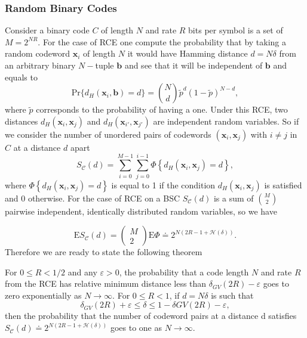 \subsubsection{Random Binary Codes}
Consider a binary code $C$ of length $N$ and rate $R$ bits per symbol is a set of $M=2^{NR}$. For the case of RCE one compute the probability that by taking a random codeword $\mathbf{x}_i$ of length $N$ it would have Hamming distance $d=N\delta$ from an arbitrary binary $N-$tuple $\mathbf{b}$ and see that it will be independent of $\mathbf{b}$ and equals to
\begin{equation}
\text{Pr}\{d_H(\mathbf{x}_i,\mathbf{b})=d\}={N\choose d} \tilde{p}^d (1-\tilde{p})^{N-d},
\end{equation}
where $\tilde{p}$ corresponds to the probability of having a one. Under this RCE, two distances $d_H(\mathbf{x}_i,\mathbf{x}_j)$ and $d_H(\mathbf{x}_{i'},\mathbf{x}_{j'})$ are independent random variables. So if we consider the number of unordered pairs of codewords $(\mathbf{x}_i,\mathbf{x}_j)$ with $i\neq j$ in $C$ at a distance $d$ apart
\begin{equation}
S_{\mathcal{C}}(d)=\sum_{i=0}^{M-1} \sum_{j=0}^{i-1} \Phi\left\{d_{H}\left(\boldsymbol{x}_{i}, \boldsymbol{x}_{j}\right)=d\right\},
\end{equation}
where $\Phi\left\{d_{H}\left(\boldsymbol{x}_{i}, \boldsymbol{x}_{j}\right)=d\right\}$ is equal to 1 if the condition $d_H(\mathbf{x}_i,\mathbf{x}_j)$ is satisfied and $0$ otherwise. For the case of RCE on a BSC $S_{\mathcal{C}}(d)$ is a sum of ${M\choose 2}$ pairwise independent, identically distributed random variables, so we have

\begin{equation}
\mathrm{E} S_{\mathcal{C}}(d)=\left(\begin{array}{c}
M \\
2
\end{array}\right) \mathrm{E} \Phi \doteq 2^{N(2 R-1+\mathcal{H}(\delta))}.
\end{equation}
Therefore we are ready to state the following theorem
\begin{theorem}
For $0\leq R< 1/2$ and any $\varepsilon>0$, the probability that a code length $N$ and rate $R$ from the RCE has relative minimum distance less than $\delta_{GV}(2R)-\varepsilon$ goes to zero exponentially as $N\to \infty$. For $0\leq R < 1$, if $d=N\delta$ is such that
\begin{equation}
\delta_{GV}(2R)+\varepsilon \leq \delta \leq 1- \delta{GV}(2R) - \varepsilon,
\end{equation}
then the probability that the number of codeword pairs at a distance d satisfies $S_{\mathcal{C}}(d) \doteq 2^{N(2 R-1+\mathcal{H}(\delta))}$ goes to one as $N\to \infty$.
\end{theorem}

